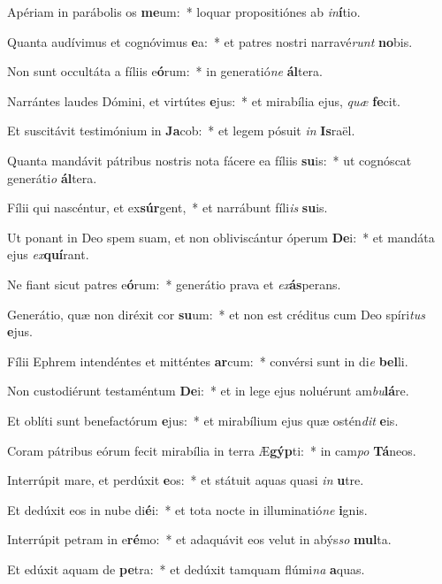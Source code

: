 \item Apériam in parábolis os \textbf{me}um:~* loquar propositiónes ab \textit{in}\textbf{í}tio.
\item Quanta audívimus et cognóvimus \textbf{e}a:~* et patres nostri narravé\textit{runt} \textbf{no}bis.
\item Non sunt occultáta a fíliis e\textbf{ó}rum:~* in generatió\textit{ne} \textbf{ál}tera.
\item Narrántes laudes Dómini, et virtútes \textbf{e}jus:~* et mirabília ejus, \textit{quæ} \textbf{fe}cit.
\item Et suscitávit testimónium in \textbf{Ja}cob:~* et legem pósuit \textit{in} \textbf{Is}raël.
\item Quanta mandávit pátribus nostris nota fácere ea fíliis \textbf{su}is:~* ut cognóscat generáti\textit{o} \textbf{ál}tera.
\item Fílii qui nascéntur, et ex\textbf{súr}gent,~* et narrábunt fíli\textit{is} \textbf{su}is.
\item Ut ponant in Deo spem suam, et non obliviscántur óperum \textbf{De}i:~* et mandáta ejus \textit{ex}\textbf{quí}rant.
\item Ne fiant sicut patres e\textbf{ó}rum:~* generátio prava et \textit{ex}\textbf{ás}perans.
\item Generátio, quæ non diréxit cor \textbf{su}um:~* et non est créditus cum Deo spíri\textit{tus} \textbf{e}jus.
\item Fílii Ephrem intendéntes et mitténtes \textbf{ar}cum:~* convérsi sunt in di\textit{e} \textbf{bel}li.
\item Non custodiérunt testaméntum \textbf{De}i:~* et in lege ejus noluérunt am\textit{bu}\textbf{lá}re.
\item Et oblíti sunt benefactórum \textbf{e}jus:~* et mirabílium ejus quæ ostén\textit{dit} \textbf{e}is.
\item Coram pátribus eórum fecit mirabília in terra Æ\textbf{gýp}ti:~* in cam\textit{po} \textbf{Tá}neos.
\item Interrúpit mare, et perdúxit \textbf{e}os:~* et státuit aquas quasi \textit{in} \textbf{u}tre.
\item Et dedúxit eos in nube di\textbf{é}i:~* et tota nocte in illuminatió\textit{ne} \textbf{i}gnis.
\item Interrúpit petram in e\textbf{ré}mo:~* et adaquávit eos velut in abýs\textit{so} \textbf{mul}ta.
\item Et edúxit aquam de \textbf{pe}tra:~* et dedúxit tamquam flúmi\textit{na} \textbf{a}quas.
